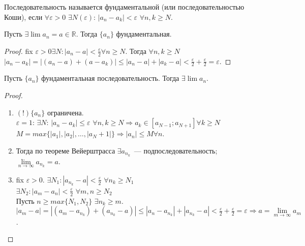 \documentclass{article}
\begin{document}
	\begin{definition}
		Последовательность называется фундаментальной (или последовательностью Коши), если $\forall \varepsilon > 0$ $\exists N(\varepsilon)$: $|a_n - a_k| < \varepsilon$ $\forall n, k \geqslant N$.
	\end{definition}
	\begin{statement}
		Пусть $\exists \lim a_n = a \in \mathbb{R}$. Тогда $\{a_n\}$ фундаментальная.
	\end{statement}
	\begin{proof}
		fix $\varepsilon > 0 \exists N: |a_n - a| < \frac{\varepsilon}{2} \forall n \geqslant N$. Тогда $\forall n, k \geqslant N$ $|a_n - a_k| = |(a_n - a) + (a - a_k)| \leqslant |a_n - a| + |a_k - a| < \frac{\varepsilon}{2} + \frac{\varepsilon}{2} = \varepsilon$.
	\end{proof}
	\begin{theorem}[Коши]
		Пусть $\{a_n\}$ фундаментальная последовательность. Тогда $\exists \lim a_n$.
	\end{theorem}
	\begin{proof}
		\begin{enumerate}[1)]
			\item $(!) \{a_n\}$ ограничена. \\
			$\varepsilon = 1$: $\exists N$: $|a_n - a_k| \leqslant \varepsilon$ $\forall n, k \geqslant N \Rightarrow a_k \in [a_{N - 1}; a_{N + 1}] \forall k \geqslant N$ \\
			$M = max\{|a_1|, |a_2|, \dots, |a_N + 1|\} \Rightarrow |a_n| \leqslant M \forall n$.
			\item Тогда по теореме Вейерштрасса $\exists a_{n_k}$~--- подпоследовательность; $\lim \limits_{n \rightarrow \infty} a_{n_k} = a$.
			\item fix $\varepsilon > 0$. $\exists N_1: |a_{n_k} - a| < \frac{\varepsilon}{2}$ $\forall n_k \geqslant N_1$ \\
			$\exists N_2: |a_m - a_n| < \frac{\varepsilon}{2}$ $\forall m, n \geqslant N_2$ \\
			Пусть $n \geqslant max\{N_1, N_2\}$ $\exists n_k \geqslant m$. \\
			$|a_m - a| = |(a_m - a_{n_k}) + (a_{n_k} - a)| \leqslant |a_n - a_{n_k}| + |a_{n_k} - a| < \frac{\varepsilon}{2} + \frac{\varepsilon}{2} = \varepsilon \Rightarrow a = \lim \limits_{m \rightarrow \infty} a_m$.
		\end{enumerate}
	\end{proof}
\end{document}
